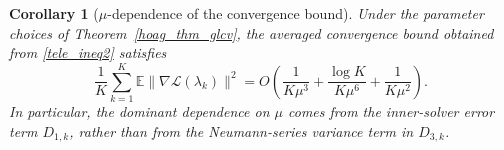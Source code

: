 \documentclass[11pt, twoside]{report}
\newtheorem{corollary}[theorem]{Corollary}
\begin{document}

\begin{corollary}[$\mu$-dependence of the convergence bound]
Under the parameter choices of Theorem~\ref{hoag_thm_glcv}, the averaged convergence bound obtained from \ref{tele_ineq2} satisfies
\[
\frac{1}{K}\sum_{k=1}^{K}\mathbb{E}\|\nabla \mathcal L(\lambda_k)\|^2
=
O\left(
\frac{1}{K\mu^3}
+
\frac{\log K}{K\mu^6}
+
\frac{1}{K\mu^2}
\right).
\]
In particular, the dominant dependence on $\mu$ comes from the inner-solver error term
$D_{1,k}$, rather than from the Neumann-series variance term in $D_{3,k}$.
\end{corollary}
\end{document}
